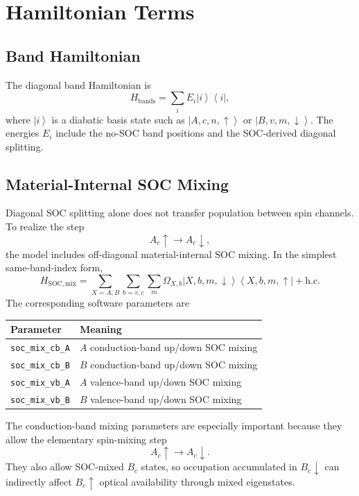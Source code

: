 \documentclass[11pt,a4paper]{article}
\newcommand{\ket}[1]{\left|#1\right\rangle}
\newcommand{\bra}[1]{\left\langle #1\right|}
\begin{document}
\section{Hamiltonian Terms}

\subsection{Band Hamiltonian}

The diagonal band Hamiltonian is
\begin{equation}
H_{\mathrm{bands}} = \sum_i E_i \ket{i}\bra{i},
\end{equation}
where $\ket{i}$ is a diabatic basis state such as $\ket{A,c,n,\uparrow}$ or $\ket{B,v,m,\downarrow}$.  The energies $E_i$ include the no-SOC band positions and the SOC-derived diagonal splitting.

\subsection{Material-Internal SOC Mixing}

Diagonal SOC splitting alone does not transfer population between spin channels.  To realize the step
\begin{equation}
A_c\uparrow \rightarrow A_c\downarrow,
\end{equation}
the model includes off-diagonal material-internal SOC mixing.  In the simplest same-band-index form,
\begin{equation}
H_{\mathrm{SOC,mix}} =
\sum_{X=A,B}\sum_{b=v,c}\sum_m
\Omega_{X,b}
\ket{X,b,m,\downarrow}\bra{X,b,m,\uparrow}
+\mathrm{h.c.}
\end{equation}
The corresponding software parameters are
\begin{center}
\begin{tabular}{ll}
\toprule
Parameter & Meaning \\
\midrule
\texttt{soc\_mix\_cb\_A} & $A$ conduction-band up/down SOC mixing \\
\texttt{soc\_mix\_cb\_B} & $B$ conduction-band up/down SOC mixing \\
\texttt{soc\_mix\_vb\_A} & $A$ valence-band up/down SOC mixing \\
\texttt{soc\_mix\_vb\_B} & $B$ valence-band up/down SOC mixing \\
\bottomrule
\end{tabular}
\end{center}
The conduction-band mixing parameters are especially important because they allow the elementary spin-mixing step
\begin{equation}
A_c\uparrow \rightarrow A_c\downarrow.
\end{equation}
They also allow SOC-mixed $B_c$ states, so occupation accumulated in $B_c\downarrow$ can indirectly affect $B_c\uparrow$ optical availability through mixed eigenstates.
\end{document}
